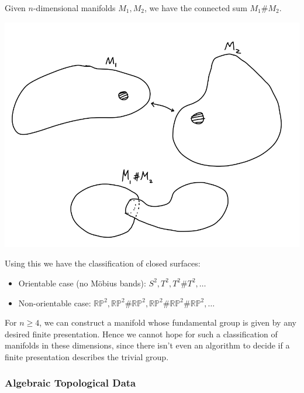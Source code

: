 \documentclass{article}
\theoremstyle{definition}
\newcommand{\RP}{\mathbb{RP}}
\begin{document}
Given $n$-dimensional manifolds $M_1,M_2$, we have the connected sum $M_1\#M_2$.
\begin{center}
    \includegraphics[scale=0.3]{manifolds_connectedsum}
\end{center}
Using this we have the classification of closed surfaces:
\begin{itemize}
    \item Orientable case (no M\"obius bands): $S^2,T^2,T^2\#T^2,\ldots$
    \item Non-orientable case: $\RP^2,\RP^2\#\RP^2,\RP^2\#\RP^2\#\RP^2,\ldots$
\end{itemize}
For $n\ge4$, we can construct a manifold whose fundamental group is given by any
desired finite presentation. Hence we cannot hope for such a classification of
manifolds in these dimensions, since there isn't even an algorithm to decide if
a finite presentation describes the trivial group.

\subsubsection*{Algebraic Topological Data}
\end{document}
